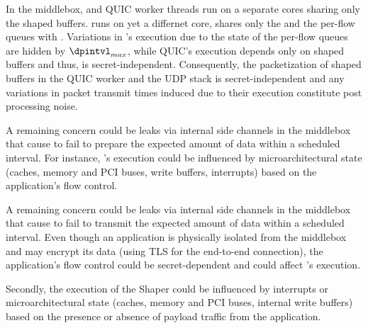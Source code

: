 
In the middlebox, {\prepare} and QUIC worker threads run on a separate cores
sharing only the shaped buffers.
{\ushaper} runs on yet a differnet core, shares only the
{\flowmap} and the per-flow queues with {\dshaper}.
Variations in {\prepare}'s execution due to the state of the
per-flow queues are hidden by $\dpintvl_{max}$, while QUIC's
execution depends only on shaped buffers and thus, is secret-independent.
Consequently, the packetization of shaped buffers in the QUIC worker and the UDP
stack is secret-independent and any variations in packet transmit times induced
due to their execution constitute post processing noise.

A remaining concern could be leaks via internal side channels in the middlebox
that cause {\dshaper} to fail to prepare the expected amount of data within a
scheduled interval.
For instance, {\dshaper}'s execution could be influenced by microarchitectural
state (\eg caches, memory and PCI buses, write buffers, interrupts) based on the
application's flow control.

A remaining concern could be leaks via internal side channels in the middlebox
that cause {\sys} to fail to transmit the expected amount of data within a
scheduled interval. Even though an application is physically isolated from the
middlebox and may encrypt its data (\eg using TLS for the end-to-end
connection), the application’s flow control could be secret-dependent and could
affect {\sys}'s execution.

 Secondly, the execution of the Shaper could be influenced by interrupts
or microarchitectural state (\eg caches, memory and PCI buses, internal write
buffers) based on the presence or absence of payload traffic from the
application.
\fi

